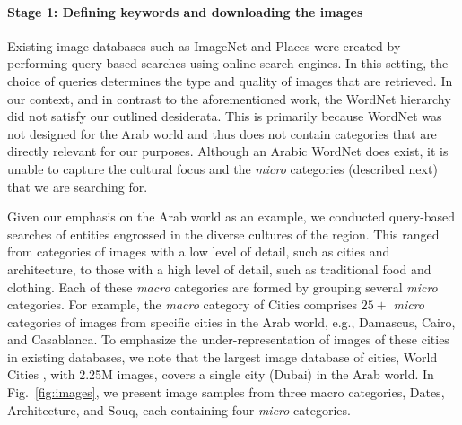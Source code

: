 \documentclass{article}
\begin{document}
\paragraph{Stage 1: Defining keywords and downloading the images}


Existing image databases such as ImageNet and Places were created by performing query-based searches using online search engines. In this setting, the choice of queries determines the type and quality of images that are retrieved. In our context, and in contrast to the aforementioned work, the WordNet hierarchy \cite{Fellbaum2010} did not satisfy our outlined desiderata. This is primarily because WordNet was not designed for the Arab world and thus does not contain categories that are directly relevant for our purposes. Although an Arabic WordNet \cite{Black2006} does exist, it is unable to capture the cultural focus and the \textit{micro} categories (described next) that we are searching for. 

Given our emphasis on the Arab world as an example, we conducted query-based searches of entities engrossed in the diverse cultures of the region. This ranged from categories of images with a low level of detail, such as cities and architecture, to those with a high level of detail, such as traditional food and clothing. Each of these \textit{macro} categories are formed by grouping several \textit{micro} categories. For example, the \textit{macro} category of $\mathrm{Cities}$ comprises $25+$ \textit{micro} categories of images from specific cities in the Arab world, e.g., Damascus, Cairo, and Casablanca. To emphasize the under-representation of images of these cities in existing databases, we note that the largest image database of cities, World Cities \cite{Tolias2011}, with 2.25M images, covers a single city (Dubai) in the Arab world. In Fig.~\ref{fig:images}, we present image samples from three macro categories, $\mathrm{Dates}$, $\mathrm{Architecture}$, and $\mathrm{Souq}$, each containing four \textit{micro} categories.
\end{document}
